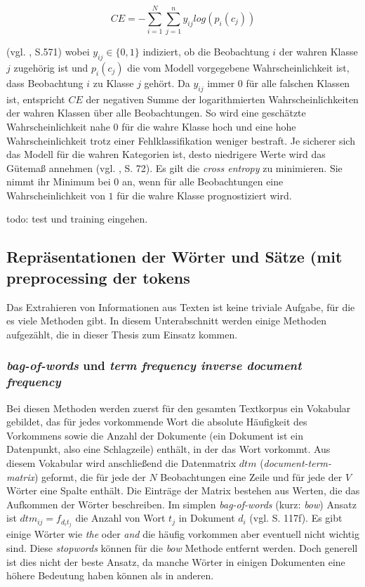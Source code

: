 \documentclass[a4paper,11pt]{article}
\begin{document}
\[ CE = -\sum_{i=1}^N \sum_{j = 1}^n y_{ij} log(p_i(c_j)) \]

(vgl. \cite{murphy}, S.571) wobei $y_{ij} \in \{0,1\}$ indiziert, ob die Beobachtung $i$ der wahren Klasse $j$ zugehörig ist und $p_i(c_j)$ die vom Modell vorgegebene Wahrscheinlichkeit ist, dass Beobachtung $i$ zu Klasse $j$ gehört. Da $y_{ij}$ immer $0$ für alle falschen Klassen ist, entspricht $CE$ der negativen Summe der logarithmierten Wahrscheinlichkeiten der wahren Klassen über alle Beobachtungen. So wird eine geschätzte Wahrscheinlichkeit nahe $0$ für die wahre Klasse hoch und eine hohe Wahrscheinlichkeit trotz einer Fehlklassifikation weniger bestraft. Je sicherer sich das Modell für die wahren Kategorien ist, desto niedrigere Werte wird das Gütemaß annehmen (vgl. \cite{proMachine}, S. 72). 
Es gilt die \textit{cross entropy} zu minimieren. Sie nimmt ihr Minimum bei $0$ an, wenn für alle Beobachtungen eine Wahrscheinlichkeit von $1$ für die wahre Klasse prognostiziert wird.

todo: test und training eingehen.

\subsection{Repräsentationen der Wörter und Sätze (mit preprocessing der tokens} \label{kap:3.1Wordemb}

Das Extrahieren von Informationen aus Texten ist keine triviale Aufgabe, für die es viele Methoden gibt. In diesem Unterabschnitt werden einige Methoden aufgezählt, die in dieser Thesis zum Einsatz kommen.


\subsubsection{\textit{bag-of-words} und \textit{term frequency inverse document frequency}} \label{Kap:Tfidf}

Bei diesen Methoden werden zuerst für den gesamten Textkorpus ein Vokabular gebildet, das für jedes vorkommende Wort die absolute Häufigkeit des Vorkommens sowie die Anzahl der Dokumente (ein Dokument ist ein Datenpunkt, also eine Schlagzeile) enthält, in der das Wort vorkommt. Aus diesem Vokabular wird anschließend die Datenmatrix $dtm$ (\textit{document-term-matrix}) geformt, die für jede der $N$ Beobachtungen eine Zeile und für jede der $V$ Wörter eine Spalte enthält. Die Einträge der Matrix bestehen aus Werten, die das Aufkommen der Wörter beschreiben. Im simplen \textit{bag-of-words} (kurz: \textit{bow}) Ansatz ist $dtm_{ij} = f_{d_i t_j}$ die Anzahl von Wort $t_j$ in Dokument $d_i$ (vgl. \cite{deepEssentials} S. 117f). Es gibt einige Wörter wie \textit{the} oder \textit{and} die häufig vorkommen aber eventuell nicht wichtig sind. Diese \textit{stopwords} können für die \textit{bow} Methode entfernt werden. Doch generell ist dies nicht der beste Ansatz, da manche Wörter in einigen Dokumenten eine höhere Bedeutung haben können als in anderen. \\
\end{document}
